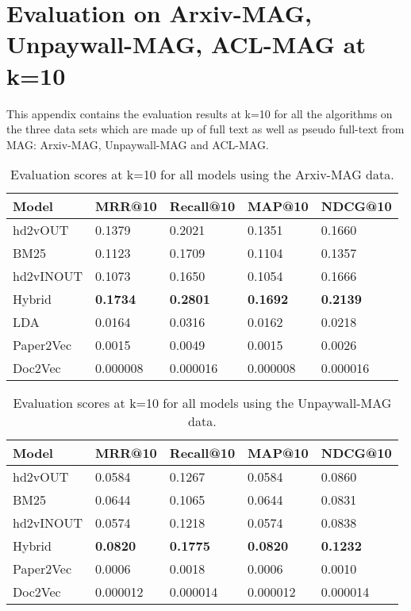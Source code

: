\chapter{Evaluation on Arxiv-MAG, Unpaywall-MAG, ACL-MAG at k=10}\label{chap:fulltexteval}
This appendix contains the evaluation results at k=10 for all the algorithms on the three data sets which are made up of full text as well as pseudo full-text from MAG: Arxiv-MAG, Unpaywall-MAG and ACL-MAG.
\begin{table}[h]
\centering
    \caption{Evaluation scores at k=10 for all models using the Arxiv-MAG data.}
    \label{tab:mag50evalk10}
\begin{center}
    \begin{tabular}{lllll}
    \toprule
    Model & MRR@10 & Recall@10 & MAP@10 & NDCG@10 \\
    \midrule
    hd2vOUT  & 0.1379 & 0.2021 & 0.1351 & 0.1660 \\
    BM25       & 0.1123 & 0.1709 & 0.1104 & 0.1357 \\
    hd2vINOUT & 0.1073 & 0.1650 & 0.1054 & 0.1666 \\
    Hybrid  & \textbf{0.1734} & \textbf{0.2801} & \textbf{0.1692} & \textbf{0.2139} \\
    LDA     & 0.0164 & 0.0316 & 0.0162 & 0.0218 \\
    Paper2Vec        & 0.0015 & 0.0049 & 0.0015 & 0.0026 \\
    Doc2Vec       & 0.000008 & 0.000016 & 0.000008 & 0.000016 \\
    \bottomrule
    \end{tabular}
\end{center}
\end{table}
\begin{table}[]
\centering
    \caption{Evaluation scores at k=10 for all models using the Unpaywall-MAG data.}
    \label{tab:mag50evalk10}
\begin{center}
    \begin{tabular}{lllll}
    \toprule
    Model & MRR@10 & Recall@10 & MAP@10 & NDCG@10 \\
    \midrule
    hd2vOUT  & 0.0584 & 0.1267 & 0.0584 & 0.0860 \\
    BM25       & 0.0644 & 0.1065 & 0.0644 & 0.0831 \\
    hd2vINOUT & 0.0574 & 0.1218 & 0.0574 & 0.0838 \\
    Hybrid  & \textbf{0.0820} & \textbf{0.1775} & \textbf{0.0820} & \textbf{0.1232} \\
    Paper2Vec  & 0.0006 & 0.0018 & 0.0006 & 0.0010 \\
    Doc2Vec       & 0.000012 & 0.000014 & 0.000012 & 0.000014 \\
    \bottomrule
    \end{tabular}
\end{center}
\end{table}
